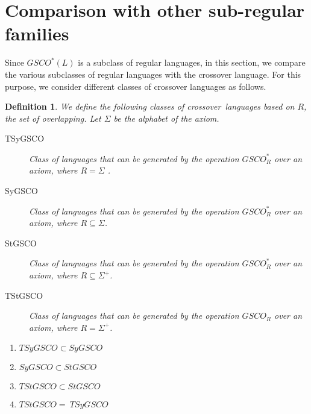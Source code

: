 \documentclass{llncs}
\newtheorem{defin}{Definition}
\newcommand{\sa}{crossover~}
\newcommand{\sg}{\Sigma}
\begin{document}
\section{Comparison with other sub-regular families}
Since $GSCO^*(L)$ is a subclass of regular languages, in this
section, we compare the various subclasses of regular languages with
the crossover language. For this
 purpose, we consider different classes of crossover languages as follows.

\begin{defin}
We define the following classes of \sa languages based on $R$, the
set of overlapping. Let $\sg$ be the alphabet of the axiom.
\begin{description}

\item[TSyGSCO] Class of languages that can be generated  by the operation
$GSCO^*_R$ over an  axiom, where $R = \sg$ .
\item[SyGSCO] Class of languages that can be generated by the operation $GSCO^*_R$
over an  axiom, where $R \subseteq \sg$.
\item[StGSCO] Class of languages that can be generated by the operation  $GSCO^*_R$
over an  axiom, where $R \subseteq \sg^+$.
\item[TStGSCO] Class of languages that can be generated by the operation $GSCO_R$
over an axiom, where $R =\sg^+$.
\end{description}
\end{defin}
\begin{theorem}

\begin{enumerate}
\item $TSyGSCO\subset SyGSCO$
\item $SyGSCO\subset StGSCO$
\item $TStGSCO \subset StGSCO$
\item $TStGSCO=~TSyGSCO$
\end{enumerate}
\end{theorem}
\end{document}
